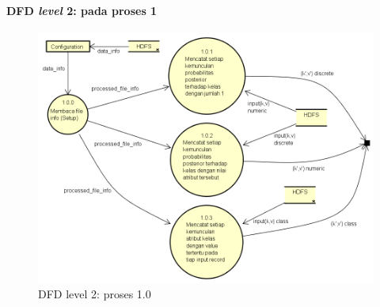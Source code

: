 \paragraph{DFD \textit{level} 2: pada proses 1}
\begin{figure}[H]
	\centering
	\includegraphics[scale=0.5]{Diagram/DFD_1_1_Training_Map}
	\caption[DFD level 2: proses 1.0]{DFD level 2: proses 1.0}
	\label{fig:DFD level 2: proses 1.0}
\end{figure}

